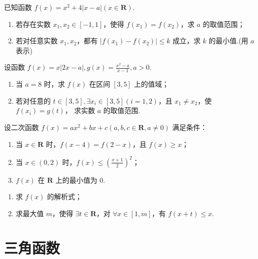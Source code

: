\documentclass[a4paper , final]{ctexart}
\newenvironment{problem}[1]{%
  \item #1
  \par
  \vspace{8cm}
}{}
\begin{document}
\begin{problems}
    \begin{problem}
    {
    已知函数 $ f(x) = x^2+4\left\vert x-a\right\vert (x\in \mathbf{R})$.
    \begin{enumerate}[label=(\arabic*)]
        \item 若存在实数 $ x_1,x_2 \in [-1,1]$，使得 $ f(x_1) = f(x_2)$，求 $ a$ 的取值范围；
        \item 若对任意实数 $x_1,x_2$，都有 $\left\vert f(x_1)-f(x_2)\right\vert\leq k$ 成立，求 $ k$ 的最小值.(用 $a$ 表示)
    \end{enumerate}
    }
    \end{problem}

    \begin{problem}
    {
    设函数 $f(x)=x\left\vert 2x-a\right\vert,g(x) = \frac{x^2-a}{x-1},a>0$.
    \begin{enumerate}[label=(\arabic*)]
        \item 当 $a=8$ 时，求 $f(x)$ 在区间 $[3,5]$ 上的值域；
        \item 若对任意的 $t\in[3,5],\exists x_i\in[3,5](i=1,2)$，且 $x_1\neq x_2$，使 $f(x_i) = g(t)$， 求实数 $a$ 的取值范围.
    \end{enumerate}
    }
    \end{problem}

    \newpage
    \begin{problem}
    {
    设二次函数 $f(x) = ax^2+bx+c(a,b,c\in \mathbf{R},a\neq 0)$ 满足条件：
    \begin{enumerate}[label=\alph*.]
        \item 当 $x\in \mathbf{R}$ 时，$f(x-4)=f(2-x)$，且 $f(x)\geq x$；
        \item 当 $x\in (0,2)$ 时，$f(x)\leq \left(\frac{x+1}{2}\right)^2$；
        \item $f(x)$ 在 $\mathbf{R}$ 上的最小值为 $0$.
    \end{enumerate}
    \begin{enumerate}[label=(\arabic*)]
        \item 求 $f(x)$ 的解析式；
        \item 求最大值 $m$，使得 $\exists t\in\mathbf{R}$，对 $\forall x \in [1,m]$，有 $f(x+t)\leq x$.
    \end{enumerate}
    }
    \end{problem}

\end{problems}

\newpage
\section*{三角函数}
\end{document}

